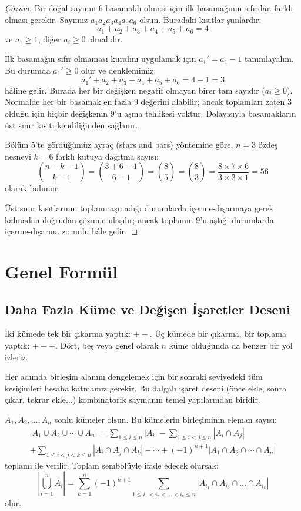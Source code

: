 \begin{proof}[Çözüm]
Bir doğal sayının 6 basamaklı olması için ilk basamağının sıfırdan farklı olması
gerekir. Sayımız $a_1 a_2 a_3 a_4 a_5 a_6$ olsun. Buradaki kısıtlar şunlardır: \[
a_1 + a_2 + a_3 + a_4 + a_5 + a_6 = 4 \] ve $a_1 \ge 1$, diğer $a_i \ge 0$ olmalıdır.

İlk basamağın sıfır olmaması kuralını uygulamak için $a_1' = a_1 - 1$
tanımlayalım. Bu durumda $a_1' \ge 0$ olur ve denklemimiz: \[ a_1' + a_2 + a_3 +
a_4 + a_5 + a_6 = 4 - 1 = 3 \] hâline gelir. Burada her bir değişken negatif
olmayan birer tam sayıdır ($a_i \ge 0$). Normalde her bir basamak en fazla 9
değerini alabilir; ancak toplamları zaten 3 olduğu için hiçbir değişkenin 9'u
aşma tehlikesi yoktur. Dolayısıyla basamakların üst sınır kısıtı kendiliğinden
sağlanır.

Bölüm 5'te gördüğümüz ayraç (stars and bars) yöntemine göre, $n=3$ özdeş nesneyi
$k=6$ farklı kutuya dağıtma sayısı: \[ \binom{n + k - 1}{k - 1} = \binom{3 + 6
- 1}{6 - 1} = \binom{8}{5} = \binom{8}{3} = \frac{8 \times 7 \times 6}{3
\times 2 \times 1} = 56 \] olarak bulunur.

Üst sınır kısıtlarının toplamı aşmadığı durumlarda içerme-dışarmaya gerek
kalmadan doğrudan çözüme ulaşılır; ancak toplamın 9'u aştığı durumlarda
içerme-dışarma zorunlu hâle gelir. \end{proof}

\section{Genel Formül}

\subsection{Daha Fazla Küme ve Değişen İşaretler Deseni}

İki kümede tek bir çıkarma yaptık: $+ -$. Üç kümede bir çıkarma, bir toplama
yaptık: $+ - +$. Dört, beş veya genel olarak $n$ küme olduğunda da benzer bir yol
izleriz.

Her adımda birleşim alanını dengelemek için bir sonraki seviyedeki tüm kesişimleri
hesaba katmamız gerekir. Bu dalgalı işaret deseni (önce ekle, sonra çıkar, tekrar
ekle...) kombinatorik saymanın temel yapılarından biridir.

\begin{theorem} $A_1, A_2, \dots, A_n$ sonlu kümeler
olsun. Bu kümelerin birleşiminin eleman sayısı:
\begin{multline*}
|A_1 \cup A_2 \cup \cdots \cup A_n| = \sum_{1 \le i \le n} |A_i| - \sum_{1 \le i < j \le n} |A_i \cap A_j| \\
+ \sum_{1 \le i < j < k \le n} |A_i \cap A_j \cap A_k| - \cdots + (-1)^{n+1} |A_1 \cap A_2 \cap \cdots \cap A_n|
\end{multline*}
toplamı ile verilir. Toplam sembolüyle ifade edecek olursak: \[ \left|
\bigcup_{i=1}^n A_i \right| = \sum_{k=1}^n (-1)^{k+1} \sum_{1 \le i_1 < i_2 <
\dots < i_k \le n} |A_{i_1} \cap A_{i_2} \cap \dots \cap A_{i_k}| \] olur.
\end{theorem}

